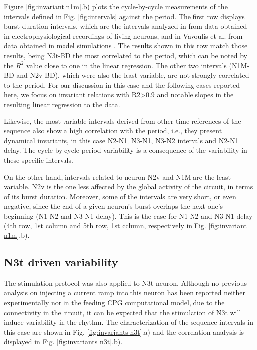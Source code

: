 Figure \ref{fig:invariant n1m}.b) plots the cycle-by-cycle measurements of the intervals defined in Fig. \ref{fig:intervals} against the period. The first row displays burst duration intervals, which are the intervals analyzed in \textcite{elliott_temporal_1991} from data obtained in electrophysiological recordings of living neurons, and in Vavoulis et al. from data obtained in model simulations \parencite{vavoulis_dynamic_2007}. The results shown in this row match those results, being N3t-BD the most correlated to the period, which can be noted by the $R^2$ value close to one in the linear regression. The other two intervals (N1M-BD and N2v-BD), which were also the least variable, are not strongly correlated to the period. For our discussion in this case and the following cases reported here, we focus on invariant relations with R2>0.9 and notable slopes in the resulting linear regression to the data. 

Likewise, the most variable intervals derived from other time references of the sequence also show a high correlation with the period, i.e., they present dynamical invariants, in this case N2-N1, N3-N1, N3-N2 intervals and N2-N1 delay. The cycle-by-cycle period variability is a consequence of the variability in these specific intervals.

On the other hand, intervals related to neuron N2v and N1M are the least variable. N2v is the one less affected by the global activity of the circuit, in terms of its burst duration. Moreover, some of the intervals are very short, or even negative, since the end of a given neuron's burst overlaps the next one's beginning (N1-N2 and N3-N1 delay). This is the case for N1-N2 and N3-N1 delay (4th row, 1st column and 5th row, 1st column, respectively in Fig. \ref{fig:invariant n1m}.b).  




\subsection{N3t driven variability}
\label{subsec:n3t driven}

The stimulation protocol was also applied to N3t neuron. Although no previous analysis on injecting a current ramp into this neuron has been reported neither experimentally nor in the feeding CPG computational model, due to the connectivity in the circuit, it can be expected that the stimulation of N3t will induce variability in the rhythm. The characterization of the sequence intervals in this case are shown in Fig. 
\ref{fig:invariants n3t}.a) and the correlation analysis is displayed in Fig. \ref{fig:invariants n3t}.b).


